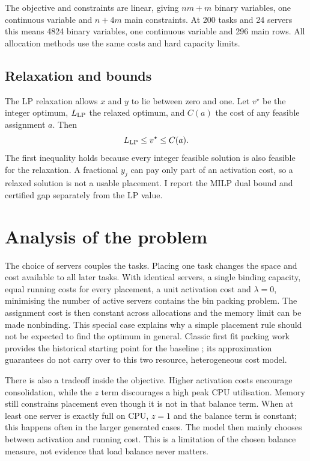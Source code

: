 \documentclass[10pt,a4paper]{article}
\begin{document}
The objective and constraints are linear, giving $nm+m$ binary variables,
one continuous variable and $n+4m$ main constraints. At 200 tasks and 24 servers
this means 4824 binary variables, one continuous variable and 296 main rows.
All allocation methods use the same costs and hard capacity limits.

\subsection{Relaxation and bounds}

The LP relaxation allows $x$ and $y$ to lie between zero and one. Let
$v^\star$ be the integer optimum, $L_{\rm LP}$ the relaxed optimum, and $C(a)$
the cost of any feasible assignment $a$. Then
\begin{equation}
L_{\rm LP}\leq v^\star\leq C(a).
\label{eq:bounds}
\end{equation}
The first inequality holds because every integer feasible solution is also
feasible for the relaxation. A fractional $y_j$ can pay only part of an
activation cost, so a relaxed solution is not a usable placement. I report
the MILP dual bound and certified gap separately from the LP value.

\section{Analysis of the problem}

The choice of servers couples the tasks. Placing one task changes the space and
cost available to all later tasks. With identical servers, a single binding
capacity, equal running costs for every placement, a unit activation cost and
$\lambda=0$, minimising the number of active servers contains the bin packing
problem. The assignment cost is then constant across allocations and the
memory limit can be made nonbinding. This special case explains why a simple
placement rule should not be expected to find the optimum in general. Classic
first fit packing work provides the historical starting point for the baseline
\cite{johnson1974}; its approximation guarantees do not carry over to this
two resource, heterogeneous cost model.

There is also a tradeoff inside the objective. Higher activation costs encourage
consolidation, while the $z$ term discourages a high peak CPU utilisation. Memory
still constrains placement even though it is not in that balance term. When at
least one server is exactly full on CPU, $z=1$ and the balance term is constant;
this happens often in the larger generated cases. The model then mainly chooses
between activation and running cost. This is a limitation of the chosen balance
measure, not evidence that load balance never matters.
\end{document}
